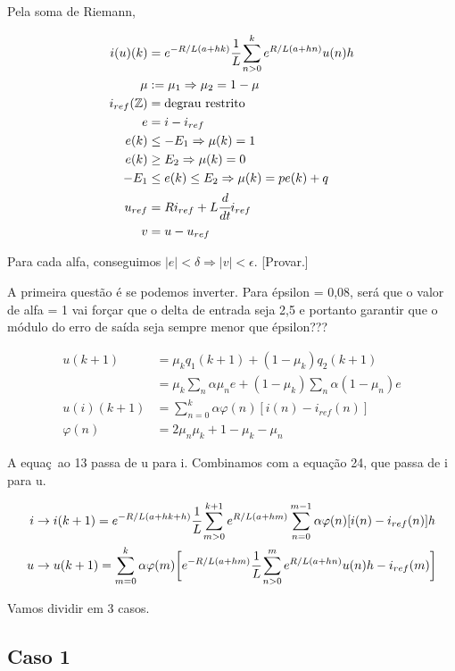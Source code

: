 \documentclass[12pt]{article}
\begin{document}
Pela soma de Riemann,

\begin{align}
  i(u)(k) &= e^{-R/L (a + hk)}\cfrac{1}{L}\sum_{n > 0}^k e^{R/L (a + hn)} u(n) h \\  \mu &:= \mu_1 \Rightarrow \mu_2 = 1 - \mu \\
  i_{ref}(\mathbb{Z}) &= \text{degrau restrito} \\
  e &= i - i_{ref} \\
  e(k) &\le - E_1 \Rightarrow \mu(k) = 1 \\
  e(k) &\ge E_2 \Rightarrow \mu(k) = 0 \\
  - E_1 &\le e(k) \le E_2 \Rightarrow \mu(k) = p e(k) + q \\
  u_{ref} &= R i_{ref} + L \cfrac{d}{dt} i_{ref} \\
  v &= u - u_{ref}
\end{align}

Para cada alfa, conseguimos $| e | < \delta \Rightarrow | v | < \epsilon$. [Provar.]

A primeira quest\~ao \'e se podemos inverter. Para \'epsilon = 0,08, ser\'a que o valor de alfa = 1 vai for\c{c}ar que o delta de entrada seja 2,5 e portanto garantir que o m\'odulo do erro de sa\'ida seja sempre menor que \'epsilon???

\begin{align}
u(k+1) &= \mu_k q_1(k+1) + (1 - \mu_k) q_2(k+1) \\
&= \mu_k \sum_n \alpha \mu_n e + (1 - \mu_k) \sum_n \alpha (1 - \mu_n) e \\
u(i)(k+1) &= \sum_{n = 0}^k \alpha \varphi(n) [i(n) - i_{ref}(n)] \\
\varphi(n) &= 2 \mu_n \mu_k + 1 - \mu_k - \mu_n
\end{align}

A equa\c{c}~ao 13 passa de u para i. Combinamos com a equa\c{c}\~ao 24, que passa de i para u.

\begin{align}
i &\to i(k+ 1) = e^{-R/L (a + hk + h)}\cfrac{1}{L}\sum_{m > 0}^{k + 1} e^{R/L (a + hm)}  \sum_{n = 0}^{m - 1} \alpha \varphi(n) [i(n) - i_{ref}(n)] h \\
u &\to u(k + 1) = \sum_{m = 0}^k \alpha \varphi(m) \bigg[e^{-R/L (a + hm)}\cfrac{1}{L}\sum_{n > 0}^m e^{R/L (a + hn)} u(n) h - i_{ref}(m)\bigg]
\end{align}

Vamos dividir em 3 casos.

\subsection{Caso 1}
\end{document}
